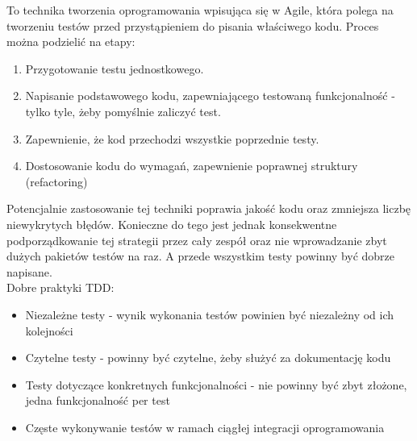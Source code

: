 \begin{definition}
To technika tworzenia oprogramowania wpisująca się w Agile, która polega na tworzeniu testów przed przystąpieniem do pisania właściwego kodu. Proces można podzielić na etapy:
\begin{enumerate}
    \item Przygotowanie testu jednostkowego.
    \item Napisanie podstawowego kodu, zapewniającego testowaną funkcjonalność - tylko tyle, żeby pomyślnie zaliczyć test.
    \item Zapewnienie, że kod przechodzi wszystkie poprzednie testy.
    \item Dostosowanie kodu do wymagań, zapewnienie poprawnej struktury (refactoring)
\end{enumerate}
\end{definition}
Potencjalnie zastosowanie tej techniki poprawia jakość kodu oraz zmniejsza liczbę niewykrytych błędów. Konieczne do tego jest jednak konsekwentne podporządkowanie tej strategii przez cały zespół oraz nie wprowadzanie zbyt dużych pakietów testów na raz. A przede wszystkim testy powinny być dobrze napisane. \\
Dobre praktyki TDD:
\begin{itemize}
    \item Niezależne testy - wynik wykonania testów powinien być niezależny od ich kolejności
    \item Czytelne testy - powinny być czytelne, żeby służyć za dokumentację kodu
    \item Testy dotyczące konkretnych funkcjonalności - nie powinny być zbyt złożone, jedna funkcjonalność per test
    \item Częste wykonywanie testów w ramach ciągłej integracji oprogramowania
\end{itemize}